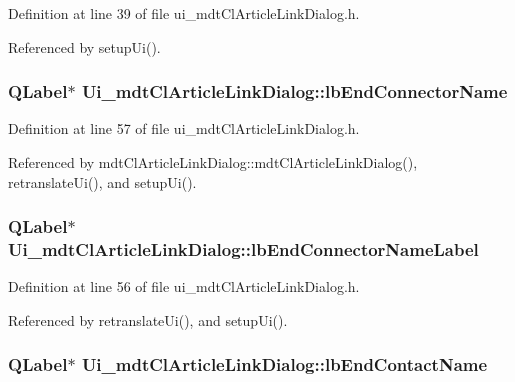 Definition at line 39 of file ui\-\_\-mdt\-Cl\-Article\-Link\-Dialog.\-h.



Referenced by setup\-Ui().

\hypertarget{class_ui__mdt_cl_article_link_dialog_a173b3c5ac4a1b46ed4ea209830ff0ba6}{
\subsubsection[{lb\-End\-Connector\-Name}]{\setlength{\rightskip}{0pt plus 5cm}Q\-Label$\ast$ Ui\-\_\-mdt\-Cl\-Article\-Link\-Dialog\-::lb\-End\-Connector\-Name}}\label{class_ui__mdt_cl_article_link_dialog_a173b3c5ac4a1b46ed4ea209830ff0ba6}


Definition at line 57 of file ui\-\_\-mdt\-Cl\-Article\-Link\-Dialog.\-h.



Referenced by mdt\-Cl\-Article\-Link\-Dialog\-::mdt\-Cl\-Article\-Link\-Dialog(), retranslate\-Ui(), and setup\-Ui().

\hypertarget{class_ui__mdt_cl_article_link_dialog_ac24c971234af2352ad8fdb31ff8300bc}{
\subsubsection[{lb\-End\-Connector\-Name\-Label}]{\setlength{\rightskip}{0pt plus 5cm}Q\-Label$\ast$ Ui\-\_\-mdt\-Cl\-Article\-Link\-Dialog\-::lb\-End\-Connector\-Name\-Label}}\label{class_ui__mdt_cl_article_link_dialog_ac24c971234af2352ad8fdb31ff8300bc}


Definition at line 56 of file ui\-\_\-mdt\-Cl\-Article\-Link\-Dialog.\-h.



Referenced by retranslate\-Ui(), and setup\-Ui().

\hypertarget{class_ui__mdt_cl_article_link_dialog_aa0163584a3ecb7d5a8ddff9c480b2e8a}{
\subsubsection[{lb\-End\-Contact\-Name}]{\setlength{\rightskip}{0pt plus 5cm}Q\-Label$\ast$ Ui\-\_\-mdt\-Cl\-Article\-Link\-Dialog\-::lb\-End\-Contact\-Name}}\label{class_ui__mdt_cl_article_link_dialog_aa0163584a3ecb7d5a8ddff9c480b2e8a}


